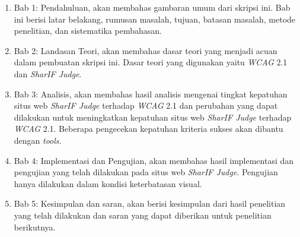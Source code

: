 \begin{enumerate}
	\item Bab 1: Pendahuluan, akan membahas gambaran umum dari skripsi ini. Bab ini berisi latar
	belakang, rumusan masalah, tujuan, batasan masalah, metode penelitian, dan sistematika
	pembahasan.
	\item Bab 2: Landasan Teori, akan membahas dasar teori yang menjadi acuan dalam pembuatan
	skripsi ini. Dasar teori yang digunakan yaitu \textit{WCAG} 2.1 dan \textit{SharIF Judge}.
	\item Bab 3: Analisis, akan membahas hasil analisis mengenai tingkat kepatuhan situs web \textit{SharIF Judge} terhadap \textit{WCAG} 2.1 dan perubahan yang dapat dilakukan untuk meningkatkan kepatuhan situs web \textit{SharIF Judge} terhadap \textit{WCAG} 2.1. Beberapa pengecekan kepatuhan kriteria sukses akan dibantu dengan \textit{tools}. 
	\item Bab 4: Implementasi dan Pengujian, akan membahas hasil implementasi dan pengujian yang
	telah dilakukan pada situs web \textit{SharIF Judge}. Pengujian hanya dilakukan dalam kondisi keterbatasan visual.
	\item Bab 5: Kesimpulan dan saran, akan berisi kesimpulan dari hasil penelitian yang telah dilakukan dan saran yang dapat diberikan untuk penelitian berikutnya.
\end{enumerate}